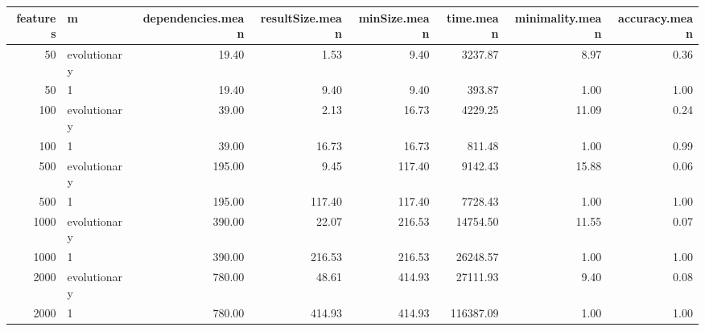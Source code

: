 \begin{table}[ht]
\centering
\begin{tabular}{rlrrrrrr}
  \hline
features & m & dependencies.mean & resultSize.mean & minSize.mean & time.mean & minimality.mean & accuracy.mean \\ 
  \hline
 50 & evolutionary & 19.40 & 1.53 & 9.40 & 3237.87 & 8.97 & 0.36 \\ 
   50 & 1 & 19.40 & 9.40 & 9.40 & 393.87 & 1.00 & 1.00 \\ 
  100 & evolutionary & 39.00 & 2.13 & 16.73 & 4229.25 & 11.09 & 0.24 \\ 
  100 & 1 & 39.00 & 16.73 & 16.73 & 811.48 & 1.00 & 0.99 \\ 
  500 & evolutionary & 195.00 & 9.45 & 117.40 & 9142.43 & 15.88 & 0.06 \\ 
  500 & 1 & 195.00 & 117.40 & 117.40 & 7728.43 & 1.00 & 1.00 \\ 
  1000 & evolutionary & 390.00 & 22.07 & 216.53 & 14754.50 & 11.55 & 0.07 \\ 
  1000 & 1 & 390.00 & 216.53 & 216.53 & 26248.57 & 1.00 & 1.00 \\ 
  2000 & evolutionary & 780.00 & 48.61 & 414.93 & 27111.93 & 9.40 & 0.08 \\ 
  2000 & 1 & 780.00 & 414.93 & 414.93 & 116387.09 & 1.00 & 1.00 \\ 
   \hline
\end{tabular}
\end{table}
